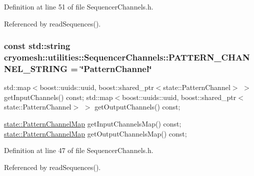 \-Definition at line 51 of file \-Sequencer\-Channels.\-h.



\-Referenced by read\-Sequences().

\hypertarget{classcryomesh_1_1utilities_1_1SequencerChannels_a0a94a00246a8cb5052e20b273aa63ecc}{
\subsubsection[{\-P\-A\-T\-T\-E\-R\-N\-\_\-\-C\-H\-A\-N\-N\-E\-L\-\_\-\-S\-T\-R\-I\-N\-G}]{\setlength{\rightskip}{0pt plus 5cm}const std\-::string {\bf cryomesh\-::utilities\-::\-Sequencer\-Channels\-::\-P\-A\-T\-T\-E\-R\-N\-\_\-\-C\-H\-A\-N\-N\-E\-L\-\_\-\-S\-T\-R\-I\-N\-G} = \char`\"{}\-Pattern\-Channel\char`\"{}}}\label{classcryomesh_1_1utilities_1_1SequencerChannels_a0a94a00246a8cb5052e20b273aa63ecc}


std\-::map$<$boost\-::uuids\-::uuid, boost\-::shared\-\_\-ptr$<$state\-::\-Pattern\-Channel$>$ $>$ get\-Input\-Channels() const; std\-::map$<$boost\-::uuids\-::uuid, boost\-::shared\-\_\-ptr$<$state\-::\-Pattern\-Channel$>$ $>$ get\-Output\-Channels() const; 

\hyperlink{classcryomesh_1_1state_1_1PatternChannelMap}{state\-::\-Pattern\-Channel\-Map} get\-Input\-Channels\-Map() const; \hyperlink{classcryomesh_1_1state_1_1PatternChannelMap}{state\-::\-Pattern\-Channel\-Map} get\-Output\-Channels\-Map() const; 

\-Definition at line 47 of file \-Sequencer\-Channels.\-h.



\-Referenced by read\-Sequences().

